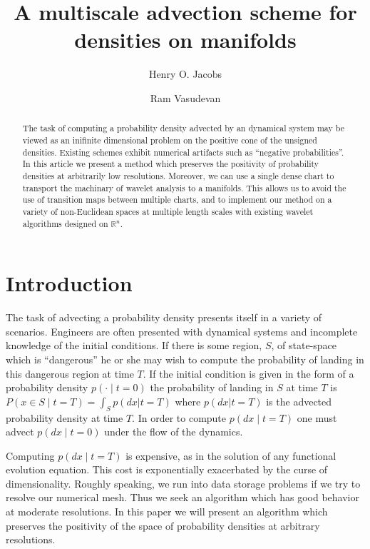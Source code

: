 \documentclass[a4paper, 12 pt]{amsart}
\title{
  A 
  multiscale
  advection scheme for
  densities on manifolds
}
\author{Henry O. Jacobs}
\author{Ram Vasudevan}
\newcommand{\R}{\mathbb{R}}
\begin{document}
\maketitle

\begin{abstract}
  The task of computing a probability density advected by an 
  dynamical system may be viewed as an inifinite dimensional problem
  on the positive cone of the unsigned densities.
  Existing schemes exhibit numerical artifacts such as
  ``negative probabilities''.
  In this article we present a method
  which preserves the positivity of probability densities
  at arbitrarily low resolutions.
  Moreover, we can use a single dense chart to transport the machinary of wavelet analysis to a manifolds.
  This allows us to avoid the use of transition maps between multiple charts, and to implement our method on a variety of non-Euclidean spaces at multiple length scales with existing wavelet algorithms designed on $\R^n$.
\end{abstract}


\section{Introduction}
  The task of advecting a probability density presents itself
  in a variety of scenarios.
  Engineers are often presented
  with dynamical systems and incomplete knowledge
  of the initial conditions.
  If there is some region, $S$, of state-space which is ``dangerous''
  he or she may wish to compute the probability of landing
  in this dangerous region at time $T$.
  If the initial condition is given in the form of a
  probability density $p(\cdot \mid t=0)$
  the probability of landing in $S$ at time $T$
  is $P( x \in S \mid t = T)  = \int_S p( dx | t=T )$
  where $p(dx|t=T)$ is the advected probability density at time $T$.
  In order to compute $p(dx\mid t=T)$
  one must advect $p(dx\mid t=0)$ under the flow of the dynamics.
  
  Computing $p(dx \mid t=T)$ is expensive, as in the solution of any
  functional evolution equation.
  This cost is exponentially exacerbated by the curse of dimensionality.
  Roughly speaking, we run into data storage problems if we try to resolve
  our numerical mesh.
  Thus we seek an algorithm which has good behavior at moderate resolutions.
  In this paper we will present an algorithm which preserves the positivity
  of the space of probability densities at arbitrary resolutions.
\end{document}
